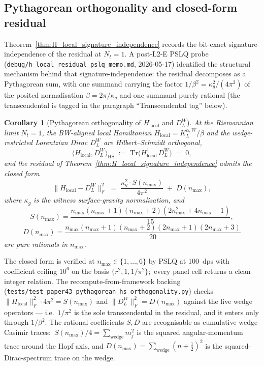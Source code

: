 \documentclass[11pt,a4paper]{article}
\theoremstyle{plain}
\newtheorem{corollary}[theorem]{Corollary}
\theoremstyle{definition}
\newcommand{\nmax}{n_{\max}}
\newcommand{\Nt}{N_t}
\newcommand{\Frob}[1]{\lVert #1 \rVert_{F}}
\newcommand{\Tr}{\mathrm{Tr}}
\newcommand{\DL}{D_{L}}
\newcommand{\KL}{K_{L}}
\begin{document}
\subsection{Pythagorean orthogonality and closed-form residual}
\label{sec:pythagorean_orthogonality}

Theorem~\ref{thm:H_local_signature_independence} records the
bit-exact signature-independence of the residual at $\Nt = 1$. A
post-L2-E PSLQ probe (\texttt{debug/h\_local\_residual\_pslq\_memo.md},
2026-05-17) identified the structural mechanism behind that
signature-independence: the residual decomposes as a Pythagorean
sum, with one summand carrying the factor
$1/\beta^{2} = \kappa_g^{2}/(4\pi^{2})$ of the posited normalisation
$\beta = 2\pi/\kappa_g$ and one summand purely rational (the
transcendental is tagged in the paragraph ``Transcendental tag'' below).

\begin{corollary}[Pythagorean orthogonality of $H_{\mathrm{local}}$
and $\DL^W$]\label{cor:pythagorean_orthogonality}
At the Riemannian limit $\Nt = 1$, the BW-aligned local Hamiltonian
$H_{\mathrm{local}} = \KL^{\alpha, W} / \beta$ and the wedge-restricted
Lorentzian Dirac $\DL^W$ are Hilbert--Schmidt orthogonal,
$$
   \big\langle H_{\mathrm{local}}, \DL^W \big\rangle_{\mathrm{HS}}
   \;:=\; \Tr\!\big(H_{\mathrm{local}}^\dagger\, \DL^W\big) \;=\; 0,
$$
and the residual of Theorem~\ref{thm:H_local_signature_independence}
admits the closed form
\begin{equation}\label{eq:pythagorean_residual}
   \Frob{H_{\mathrm{local}} - \DL^W}^2
   \;=\; \frac{\kappa_g^2 \cdot S(\nmax)}{4\pi^2}
       \;+\; D(\nmax),
\end{equation}
where $\kappa_g$ is the witness surface-gravity normalisation, and
$$
   S(\nmax) = \frac{\nmax (\nmax + 1)(\nmax + 2)(2\nmax^2 + 4\nmax - 1)}{15},
$$
$$
   D(\nmax) = \frac{\nmax (\nmax + 1)(\nmax + 2)(2\nmax + 1)(2\nmax + 3)}{20}
$$
are pure rationals in $\nmax$.
\end{corollary}

The closed form is verified at $\nmax \in \{1, \ldots, 6\}$ by PSLQ
at 100~dps with coefficient ceiling $10^6$ on the basis $\{r^2, 1,
1/\pi^2\}$;\ every panel cell returns a clean integer relation. The
recompute-from-framework backing
(\texttt{tests/test\_paper43\_pythagorean\_hs\_orthogonality.py}) checks
$\Frob{H_{\mathrm{local}}}^2 \cdot 4\pi^2 = S(\nmax)$ and
$\Frob{\DL^W}^2 = D(\nmax)$ against the live wedge operators --- i.e.\
$1/\pi^2$ is the sole transcendental in the residual, and it enters only
through $1/\beta^{2}$.
The rational coefficients $S, D$ are recognisable as cumulative
wedge-Casimir traces:\ $S(\nmax)/4 = \sum_{\mathrm{wedge}} m_j^2$ is
the squared angular-momentum trace around the Hopf axis, and
$D(\nmax) = \sum_{\mathrm{wedge}} (n + \tfrac{1}{2})^2$ is the
squared-Dirac-spectrum trace on the wedge.
\end{document}
